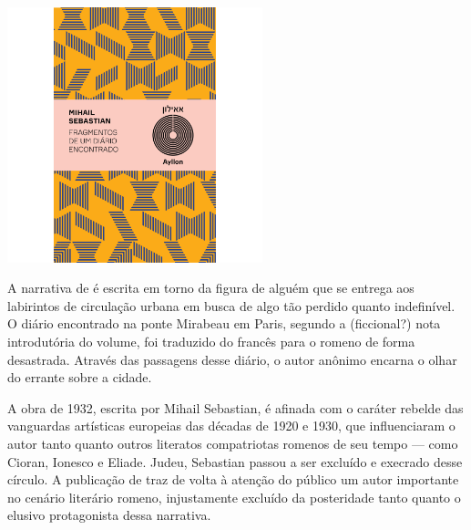 \begin{center}
\hspace*{-3.6cm}
\hspace*{3.1cm}\includegraphics[width=74mm]{./grid/sebastian.jpg}
\end{center}

\hspace*{-7cm}\hrulefill\hspace*{-7cm}

\medskip

\noindent{}A narrativa de {} é escrita em torno da figura de alguém que se entrega aos labirintos de circulação urbana em busca de algo tão perdido quanto indefinível. O diário encontrado na ponte Mirabeau em Paris, segundo a (ficcional?) nota introdutória do volume, foi traduzido do francês para o romeno de forma desastrada. Através das passagens desse diário, o autor anônimo encarna o olhar do errante sobre a cidade.

A obra de 1932, escrita por Mihail Sebastian, é afinada com o caráter rebelde das vanguardas artísticas europeias das décadas de 1920 e 1930, que influenciaram o autor tanto quanto outros literatos compatriotas romenos de seu tempo --- como Cioran, Ionesco e Eliade. Judeu, Sebastian passou a ser excluído e execrado desse círculo. A publicação de {} traz de volta à atenção do público um autor importante no cenário literário romeno, injustamente excluído da posteridade tanto quanto o elusivo protagonista dessa narrativa.

\vfill

\hspace*{-.4cm}\begin{minipage}[c]{1\linewidth}
\small{
{}}
\end{minipage}

